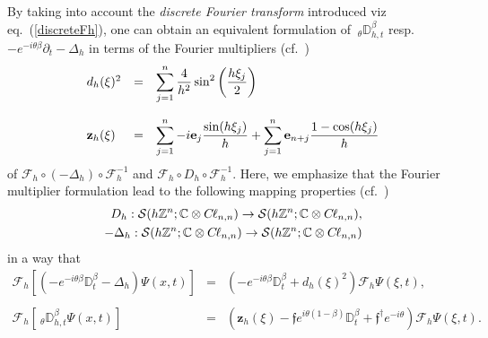 \documentclass{elsarticle}
\newcommand{\BC}{{\mathbb C}}
\newcommand{\BZ}{{\mathbb Z}}
\newcommand{\e}{{\bf e}}
\newcommand{\f}{{\mathfrak f}}
\newcommand{\cl}{C \kern -0.1em \ell}
\begin{document}
By taking into account the \textit{discrete Fourier transform} introduced viz eq.~(\ref{discreteFh}), one can obtain an equivalent formulation of  ${~}_\theta\mathbb{D}_{h,t}^\beta$ resp.  $-e^{-i\theta\beta}\partial_t-\Delta_h$ in terms of the Fourier multipliers (cf.~\cite[Section 3.3]{F19b})
\begin{eqnarray}
	\label{FourierMultipliers}
	\begin{array}{lll}
		d_h(\xi)^2&=&\displaystyle \sum_{j=1}^{n}\frac{4}{h^2}\sin^2\left(\frac{h\xi_j}{2}\right) \\ \ \\ 
		\textbf{z}_{h}(\xi)
		&=&\displaystyle \sum_{j=1}^n -i\e_j\dfrac{\sin(h\xi_j)}{h}+\sum_{j=1}^n \e_{n+j}\dfrac{1-\cos(h\xi_j)}{h}
	\end{array}
\end{eqnarray} 
of $\mathcal{F}_h\circ (-\Delta_h)\circ \mathcal{F}_h^{-1}$ and $\mathcal{F}_h\circ D_h\circ \mathcal{F}_h^{-1}$. Here, we emphasize that the Fourier multiplier formulation lead to the following mapping properties (cf.~\cite[Subsection 21.2.2]{F19})
\begin{eqnarray*}
	D_h:\mathcal{S}(h\BZ^n;\BC \otimes \cl_{n,n})\rightarrow \mathcal{S}(h\BZ^n;\BC \otimes \cl_{n,n}), \\
	-\Delta_h:\mathcal{S}(h\BZ^n;\BC \otimes \cl_{n,n})\rightarrow \mathcal{S}(h\BZ^n;\BC \otimes \cl_{n,n})
\end{eqnarray*}
in a way that
\begin{eqnarray*}
	\mathcal{F}_h\left[\left(-e^{-i\theta\beta}\mathbb{D}_t^\beta-\Delta_h\right)\Psi(x,t)\right]&=&\left(-e^{-i\theta\beta}\mathbb{D}_t^\beta+d_h(\xi)^2\right)\mathcal{F}_h\Psi(\xi,t),
	\\ \ \\
	\mathcal{F}_h\left[{~}_\theta\mathbb{D}_{h,t}^\beta \Psi(x,t)\right]&=&	\left(\textbf{z}_{h}(\xi)-\f e^{i\theta(1-\beta)}\mathbb{D}_t^\beta+\f^\dagger e^{-i\theta}\right)\mathcal{F}_h\Psi(\xi,t).
\end{eqnarray*}
\end{document}
